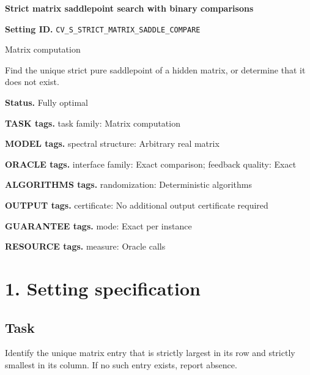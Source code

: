 \documentclass[10pt,a4paper]{article}
\begin{document}
\raggedright

{\LARGE\bfseries\sffamily\color{AtlasNavy} Strict matrix saddlepoint search with binary comparisons\par}\vspace{5pt}


\textbf{Setting ID.} \texttt{CV\_\allowbreak{}S\_\allowbreak{}STRICT\_\allowbreak{}MATRIX\_\allowbreak{}SADDLE\_\allowbreak{}COMPARE}



Matrix computation



Find the unique strict pure saddlepoint of a hidden matrix, or determine that it does not exist.



\textbf{Status.} Fully optimal



\textbf{TASK tags.} task family: Matrix computation



\textbf{MODEL tags.} spectral structure: Arbitrary real matrix



\textbf{ORACLE tags.} interface family: Exact comparison; feedback quality: Exact



\textbf{ALGORITHMS tags.} randomization: Deterministic algorithms



\textbf{OUTPUT tags.} certificate: No additional output certificate required



\textbf{GUARANTEE tags.} mode: Exact per instance



\textbf{RESOURCE tags.} measure: Oracle calls



\section{1. Setting specification}


\subsection{Task}


Identify the unique matrix entry that is strictly largest in its row and strictly smallest in its column. If no such entry exists, report absence.
\end{document}
